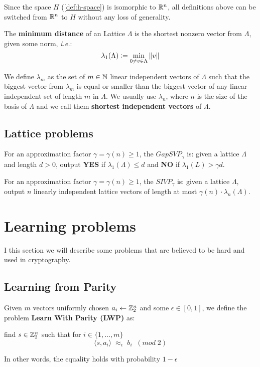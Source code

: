 \documentclass[Ingles]{ic-tese-v3}
\begin{document}
Since the space \(H\) (\ref{def:h-space}) is isomorphic to \(\mathbb{R}^n\), all definitions above can be switched from \(\mathbb{R}^n\) to \(H\) without any loss of generality.

\begin{definition}
  The \textbf{minimum distance} of an Lattice $\Lambda$ is the shortest nonzero vector
  from $\Lambda$, given some norm, \textit{i.e.}:
  $$
  \lambda_1(\Lambda) \vcentcolon = \min_{0 \ne v \in \Lambda}{\|v\|}
  $$

  We define $\lambda_m$ as the set of $m \in \mathbb{N}$  linear independent vectors of $\Lambda$
  such that the biggest vector from $\lambda_m$ is equal or smaller than the biggest
  vector of any linear independent set of length $m$ in $\Lambda$. We usually use
  $\lambda_n$, where $n$ is the size of the basis of $\Lambda$ and we call them
  \textbf{shortest independent vectors} of $\Lambda$.
\end{definition}

\subsection{Lattice problems}
\label{sec:orgaa8d66e}
\begin{definition}
  \label{def:gapsvp}
For an approximation factor $\gamma  = \gamma(n) \geq 1$, the $GapSVP_\gamma $ is: given a lattice
$\Lambda$ and length $d > 0$, output \textbf{YES} if $\lambda_1(\Lambda) \leq d$ and \textbf{NO} if
$\lambda_1(L) > \gamma d$.  
\end{definition}

\begin{definition}
  \label{def:sivp}
  For an approximation factor $\gamma = \gamma(n) \geq 1$, the $SIVP_\gamma$ is: given a lattice $\Lambda$, output $n$ linearly independent lattice vectors of length at most $\gamma(n) \cdot \lambda_n(\Lambda)$.
\end{definition}

\section{Learning problems}
\label{sec:orgdb2d1f4}
I this section we will describe some problems that are believed to be hard and used in cryptography. 
\subsection{Learning from Parity}
\label{sec:org7d22c9e}
 \begin{definition}
  \label{def:LWP}
  Given $m$ vectors uniformly chosen  $a_i \gets \mathbb{Z}^n_2$ and some $\epsilon \in [0,1]$, we
  define the problem \textbf{Learn With Parity (LWP)} as:

  find $s \in \mathbb{Z}^n_2$ such that for $i \in \{1,\dots,m\}$
     $$ \langle{s, a_i}\rangle \; \approx_\epsilon \; b_i \;\; (mod\; 2) $$

     In other words, the equality holds with probability $1 - \epsilon$

\end{definition}
\end{document}
